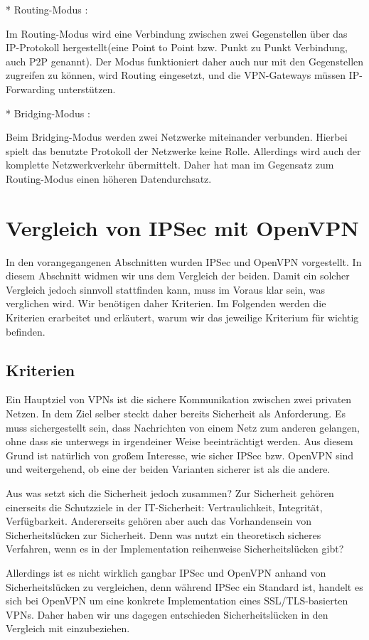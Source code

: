 \documentclass[12pt]{scrartcl}
\begin{document}
* Routing-Modus :

Im Routing-Modus wird eine Verbindung zwischen zwei Gegenstellen über das IP-Protokoll hergestellt(eine Point to Point bzw. Punkt zu Punkt Verbindung, auch P2P genannt). Der  Modus funktioniert daher auch nur mit den Gegenstellen zugreifen zu können, wird Routing eingesetzt, und die VPN-Gateways müssen IP-Forwarding unterstützen.

* Bridging-Modus : 

Beim Bridging-Modus werden zwei Netzwerke miteinander verbunden. Hierbei spielt das benutzte Protokoll der Netzwerke keine Rolle. Allerdings wird auch der komplette Netzwerkverkehr übermittelt. Daher hat man im Gegensatz zum Routing-Modus einen höheren Datendurchsatz.

\section{Vergleich von IPSec mit OpenVPN}

In den vorangegangenen Abschnitten wurden IPSec und OpenVPN vorgestellt. In diesem Abschnitt widmen wir uns dem Vergleich der beiden. Damit ein solcher Vergleich jedoch sinnvoll stattfinden kann, muss im Voraus klar sein, was verglichen wird. Wir benötigen daher Kriterien. Im Folgenden werden die Kriterien erarbeitet und erläutert, warum wir das jeweilige Kriterium für wichtig befinden.

\subsection{Kriterien}
Ein Hauptziel von VPNs ist die sichere Kommunikation zwischen zwei privaten Netzen. In dem Ziel selber steckt daher bereits Sicherheit als Anforderung. Es muss sichergestellt sein, dass Nachrichten von einem Netz zum anderen gelangen, ohne dass sie unterwegs in irgendeiner Weise beeinträchtigt werden. Aus diesem Grund ist natürlich von großem Interesse, wie sicher IPSec bzw. OpenVPN sind und weitergehend, ob eine der beiden Varianten sicherer ist als die andere.

Aus was setzt sich die Sicherheit jedoch zusammen? Zur Sicherheit gehören einerseits die Schutzziele in der IT-Sicherheit: Vertraulichkeit, Integrität, Verfügbarkeit. Andererseits gehören aber auch das Vorhandensein von Sicherheitslücken zur Sicherheit. Denn was nutzt ein theoretisch sicheres Verfahren, wenn es in der Implementation reihenweise Sicherheitslücken gibt?

Allerdings ist es nicht wirklich gangbar IPSec und OpenVPN anhand von Sicherheitslücken zu vergleichen, denn während IPSec ein Standard ist\cite{RFC4301}, handelt es sich bei OpenVPN um eine konkrete Implementation eines SSL/TLS-basierten VPNs\cite{Kotuliak2011}. Daher haben wir uns dagegen entschieden Sicherheitslücken in den Vergleich mit einzubeziehen.
\end{document}
